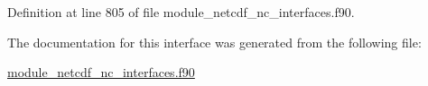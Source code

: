 Definition at line 805 of file module\+\_\+netcdf\+\_\+nc\+\_\+interfaces.\+f90.



The documentation for this interface was generated from the following file\+:\begin{DoxyCompactItemize}
\item 
\hyperlink{module__netcdf__nc__interfaces_8f90}{module\+\_\+netcdf\+\_\+nc\+\_\+interfaces.\+f90}\end{DoxyCompactItemize}
